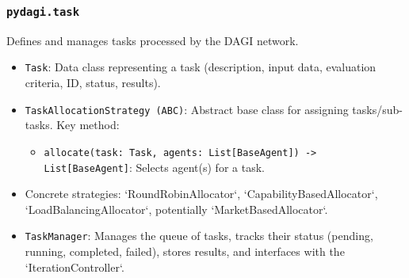 \documentclass[12pt]{amsart}
\begin{document}
\subsubsection{\texttt{pydagi.task}}
Defines and manages tasks processed by the DAGI network.
\begin{itemize}[leftmargin=*]
    \item \texttt{Task}: Data class representing a task (description, input data, evaluation criteria, ID, status, results).
    \item \texttt{TaskAllocationStrategy (ABC)}: Abstract base class for assigning tasks/sub-tasks. Key method:
        \begin{itemize}
            \item \texttt{allocate(task: Task, agents: List[BaseAgent]) -> List[BaseAgent]}: Selects agent(s) for a task.
        \end{itemize}
    \item Concrete strategies: `RoundRobinAllocator`, `CapabilityBasedAllocator`, `LoadBalancingAllocator`, potentially `MarketBasedAllocator`.
    \item \texttt{TaskManager}: Manages the queue of tasks, tracks their status (pending, running, completed, failed), stores results, and interfaces with the `IterationController`.
\end{itemize}
\end{document}
